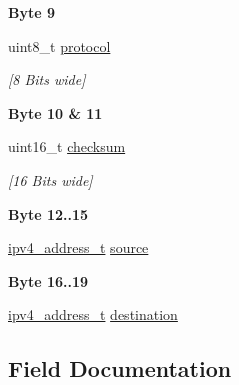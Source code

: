 \begin{Indent}\textbf{ Byte 9}\par
\begin{DoxyCompactItemize}
\item 
uint8\+\_\+t \mbox{\hyperlink{structipv4__header__t_ad124d3d2e02c729afa303c775295278e}{protocol}}
\begin{DoxyCompactList}\small\item\em \mbox{[}8 Bits wide\mbox{]} \end{DoxyCompactList}\end{DoxyCompactItemize}
\end{Indent}
\begin{Indent}\textbf{ Byte 10 \& 11}\par
\begin{DoxyCompactItemize}
\item 
uint16\+\_\+t \mbox{\hyperlink{structipv4__header__t_a6796c847bbd16253ce2538754c250bd6}{checksum}}
\begin{DoxyCompactList}\small\item\em \mbox{[}16 Bits wide\mbox{]} \end{DoxyCompactList}\end{DoxyCompactItemize}
\end{Indent}
\begin{Indent}\textbf{ Byte 12..15}\par
\begin{DoxyCompactItemize}
\item 
\mbox{\hyperlink{structipv4__address__t}{ipv4\+\_\+address\+\_\+t}} \mbox{\hyperlink{structipv4__header__t_af8fb03a8846d0d2ee53e316a7d548a8f}{source}}
\end{DoxyCompactItemize}
\end{Indent}
\begin{Indent}\textbf{ Byte 16..19}\par
\begin{DoxyCompactItemize}
\item 
\mbox{\hyperlink{structipv4__address__t}{ipv4\+\_\+address\+\_\+t}} \mbox{\hyperlink{structipv4__header__t_af22742f606b58c8db77e85c968629914}{destination}}
\end{DoxyCompactItemize}
\end{Indent}


\subsection{Field Documentation}
\mbox{\label{structipv4__header__t_a6796c847bbd16253ce2538754c250bd6}} 
